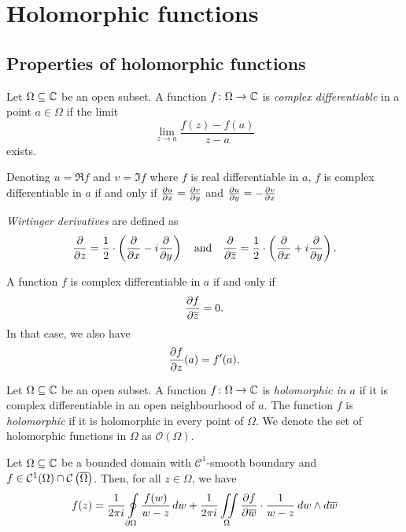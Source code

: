 \section{Holomorphic functions}

\subsection{Properties of holomorphic functions}


\begin{definicija}
Let $\Omega \subseteq \mathbb{C}$ be an open subset. A function
$f \colon \Omega \to \mathbb{C}$ is
\emph{complex differentiable}
in a point $a \in \Omega$ if the limit
\[
\lim_{z \to a} \frac{f(z) - f(a)}{z - a}
\]
exists.
\end{definicija}

\begin{opomba}
Denoting $u = \Re f$ and $v = \Im f$ where $f$ is real
differentiable in $a$, $f$ is complex differentiable in $a$ if and
only if $\frac{\partial u}{\partial x} = \frac{\partial v}{\partial y}$ and
$\frac{\partial u}{\partial y} = - \frac{\partial v}{\partial x}$
\end{opomba}

\begin{definicija}
\emph{Wirtinger derivatives} are
defined as
\[
\frac{\partial }{\partial z} =
\frac{1}{2} \cdot \left(\frac{\partial }{\partial x} - i \frac{\partial }{\partial y}\right)
\quad \text{and} \quad
\frac{\partial }{\partial \overline{z}} =
\frac{1}{2} \cdot \left(\frac{\partial }{\partial x} + i \frac{\partial }{\partial y}\right).
\]
\end{definicija}

\begin{opomba}
A function $f$ is complex differentiable in $a$ if and only if
\[
\frac{\partial f}{\partial \overline{z}} = 0.
\]
In that case, we also have
\[
\frac{\partial f}{\partial z}(a) = f'(a).
\]
\end{opomba}

\begin{definicija}
Let $\Omega \subseteq \mathbb{C}$ be an open subset. A function
$f \colon \Omega \to \mathbb{C}$ is
\emph{holomorphic in $a$} if it is
complex differentiable in an open neighbourhood of $a$. The
function $f$ is \emph{holomorphic} if it is holomorphic in every
point of $\Omega$. We denote the set of holomorphic functions in
$\Omega$ as $\mathcal{O}(\Omega)$.
\end{definicija}

\begin{izrek}
Let $\Omega \subseteq \mathbb{C}$ be a bounded domain with
$\mathcal{C}^1$-smooth boundary and
$f \in \mathcal{C}^1(\Omega) \cap \mathcal{C} \left(\overline{\Omega}\right)$.
Then, for all $z \in \Omega$, we have
\[
f(z) =
\frac{1}{2 \pi i} \oint\limits_{\partial \Omega} \frac{f(w)}{w - z}\,dw +
\frac{1}{2 \pi i} \iint\limits_\Omega \frac{\partial f}{\partial \overline{w}} \cdot
\frac{1}{w - z}\,dw \wedge d\overline{w}
\]
\end{izrek}

